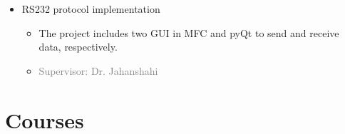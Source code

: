 \begin{itemize}
\begin{itemize}
		\item RS232 protocol implementation
		\begin{itemize}
			\item The project includes two GUI in MFC and pyQt to send and receive data, respectively. 
			\item \textcolor{gray}{Supervisor: Dr. Jahanshahi}
		\end{itemize}
	\end{itemize}
\end{itemize}


\section{Courses}
